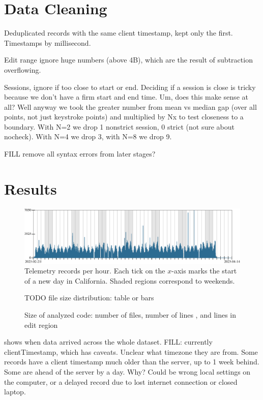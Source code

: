 \documentclass[english,submission,cleveref]{programming}
\begin{document}
\section{Data Cleaning}

Deduplicated records with the same client timestamp,
kept only the first.
Timestamps by millisecond.

Edit range ignore huge numbers (above 4B),
which are the result of subtraction overflowing.

Sessions, ignore if too close to start or end.
Deciding if a session is close is tricky because we don't have
a firm start and end time.
Um, does this make sense at all?
Well anyway we took the greater number from mean vs median
gap (over all points, not just keystroke points)
and multiplied by Nx to test closeness to a boundary.
With N=2 we drop 1 nonstrict session, 0 strict (not sure about nocheck).
With N=4 we drop 3, with N=8 we drop 9.

FILL remove all syntax errors from later stages?



\section{Results}
\label{s:data}

\begin{figure}[t]
  \includegraphics[width=\columnwidth]{img/row-distribution.pdf}
  \caption{Telemetry records per hour. Each tick on the $x$-axis marks the start of a new day in California. Shaded regions correspond to weekends.}
  \label{f:records-per-hour}
\end{figure}

\begin{figure}[t]
  TODO file size distribution: table or bars %
  \caption{Size of analyzed code: number of files, number of lines , and lines in edit region}
  \label{f:analysis-size}
\end{figure}


 shows when data arrived across the whole dataset.
FILL: currently clientTimestamp, which has caveats.
Unclear what timezone they are from.
Some records have a client timestamp much older than the server, up to 1 week behind.
Some are ahead of the server by a day.
Why?
Could be wrong local settings on the computer, or a delayed record due to lost
internet connection or closed laptop.
\end{document}
